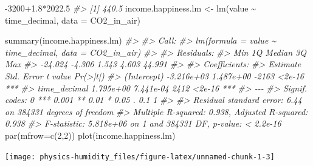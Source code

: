 \documentclass[
  12pt,
  a4paper,
  onecolumn, twoside]{article}
\newenvironment{Shaded}{\begin{snugshade}}{\end{snugshade}}
\newcommand{\AttributeTok}[1]{\textcolor[rgb]{0.77,0.63,0.00}{#1}}
\newcommand{\CommentTok}[1]{\textcolor[rgb]{0.56,0.35,0.01}{\textit{#1}}}
\newcommand{\DecValTok}[1]{\textcolor[rgb]{0.00,0.00,0.81}{#1}}
\newcommand{\FloatTok}[1]{\textcolor[rgb]{0.00,0.00,0.81}{#1}}
\newcommand{\FunctionTok}[1]{\textcolor[rgb]{0.00,0.00,0.00}{#1}}
\newcommand{\NormalTok}[1]{#1}
\newcommand{\OtherTok}[1]{\textcolor[rgb]{0.56,0.35,0.01}{#1}}
\newcommand{\SpecialCharTok}[1]{\textcolor[rgb]{0.00,0.00,0.00}{#1}}
\begin{document}
\begin{Shaded}
\begin{Highlighting}[numbers=left,,]
\SpecialCharTok{{-}}\DecValTok{3200}\FloatTok{+1.8}\SpecialCharTok{*}\FloatTok{2022.5}
\CommentTok{\#\textgreater{} [1] 440.5}
\NormalTok{income.happiness.lm }\OtherTok{\textless{}{-}} \FunctionTok{lm}\NormalTok{(value }\SpecialCharTok{\textasciitilde{}}\NormalTok{ time\_decimal, }\AttributeTok{data =}\NormalTok{ CO2\_in\_air)}

\FunctionTok{summary}\NormalTok{(income.happiness.lm)}
\CommentTok{\#\textgreater{} }
\CommentTok{\#\textgreater{} Call:}
\CommentTok{\#\textgreater{} lm(formula = value \textasciitilde{} time\_decimal, data = CO2\_in\_air)}
\CommentTok{\#\textgreater{} }
\CommentTok{\#\textgreater{} Residuals:}
\CommentTok{\#\textgreater{}     Min      1Q  Median      3Q     Max }
\CommentTok{\#\textgreater{} {-}24.024  {-}4.306   1.543   4.603  44.991 }
\CommentTok{\#\textgreater{} }
\CommentTok{\#\textgreater{} Coefficients:}
\CommentTok{\#\textgreater{}                Estimate Std. Error t value Pr(\textgreater{}|t|)    }
\CommentTok{\#\textgreater{} (Intercept)  {-}3.216e+03  1.487e+00   {-}2163   \textless{}2e{-}16 ***}
\CommentTok{\#\textgreater{} time\_decimal  1.795e+00  7.441e{-}04    2412   \textless{}2e{-}16 ***}
\CommentTok{\#\textgreater{} {-}{-}{-}}
\CommentTok{\#\textgreater{} Signif. codes:  0 \textquotesingle{}***\textquotesingle{} 0.001 \textquotesingle{}**\textquotesingle{} 0.01 \textquotesingle{}*\textquotesingle{} 0.05 \textquotesingle{}.\textquotesingle{} 0.1 \textquotesingle{} \textquotesingle{} 1}
\CommentTok{\#\textgreater{} }
\CommentTok{\#\textgreater{} Residual standard error: 6.44 on 384331 degrees of freedom}
\CommentTok{\#\textgreater{} Multiple R{-}squared:  0.938,  Adjusted R{-}squared:  0.938 }
\CommentTok{\#\textgreater{} F{-}statistic: 5.818e+06 on 1 and 384331 DF,  p{-}value: \textless{} 2.2e{-}16}
\FunctionTok{par}\NormalTok{(}\AttributeTok{mfrow=}\FunctionTok{c}\NormalTok{(}\DecValTok{2}\NormalTok{,}\DecValTok{2}\NormalTok{))}
\FunctionTok{plot}\NormalTok{(income.happiness.lm)}
\end{Highlighting}
\end{Shaded}

\texttt{[image: physics-humidity\_files/figure-latex/unnamed-chunk-1-3]}
\end{document}
